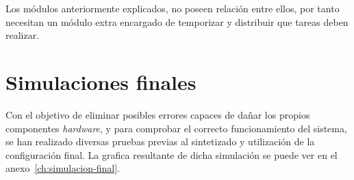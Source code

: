 Los módulos anteriormente explicados, no poseen relación entre ellos, por tanto necesitan un módulo extra encargado de temporizar y distribuir que tareas deben realizar.


\section{Simulaciones finales}
Con el objetivo de eliminar posibles errores capaces de dañar los propios componentes \emph{hardware}, y para comprobar el correcto funcionamiento del sistema, se han realizado diversas pruebas previas al sintetizado y utilización de la configuración final. La grafica resultante de dicha simulación se puede ver en el anexo~\ref{ch:simulacion-final}.

